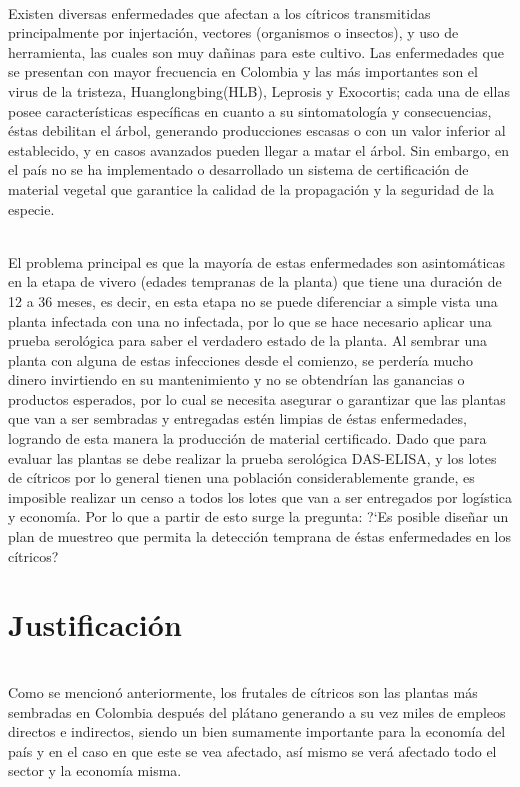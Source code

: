 ~\\Existen diversas enfermedades que afectan a los c\'{i}tricos transmitidas principalmente por injertaci\'{o}n, vectores (organismos o insectos), y uso de herramienta, las cuales son muy da\~{n}inas para este cultivo. Las enfermedades que se presentan con mayor frecuencia en Colombia y las m\'{a}s importantes son el virus de la tristeza, Huanglongbing(HLB), Leprosis y Exocortis; cada una de ellas posee caracter\'{i}sticas espec\'{i}ficas en cuanto a su sintomatolog\'{i}a y consecuencias, \'{e}stas debilitan el \'{a}rbol, generando producciones escasas o con un valor inferior al establecido, y en casos avanzados pueden llegar a matar el \'{a}rbol. Sin embargo, en el pa\'{i}s no se ha implementado o desarrollado un sistema de certificaci\'{o}n de material vegetal que garantice la calidad de la propagaci\'{o}n y la seguridad de la especie.

~\\El problema principal es que la mayor\'{i}a de estas enfermedades son asintom\'{a}ticas en la etapa de vivero (edades tempranas de la planta) que tiene una duraci\'{o}n de 12 a 36 meses, es decir, en esta etapa no se puede diferenciar a simple vista una planta infectada con una no infectada, por lo que se hace necesario aplicar una prueba serol\'{o}gica para saber el verdadero estado de la planta. Al sembrar una planta con alguna de estas infecciones desde el comienzo, se perder\'{i}a mucho dinero invirtiendo en su mantenimiento y no se obtendr\'{i}an las ganancias o productos esperados, por lo cual se necesita asegurar o garantizar que las plantas que van a ser sembradas y entregadas est\'{e}n limpias de \'{e}stas enfermedades, logrando de esta manera la producci\'{o}n de material certificado. Dado que para evaluar las plantas se debe realizar la prueba serol\'{o}gica DAS-ELISA, y los lotes de c\'{i}tricos por lo general tienen una poblaci\'{o}n considerablemente grande, es imposible realizar un censo a todos los lotes que van a ser entregados por log\'{i}stica y econom\'{i}a. Por lo que a partir de esto surge la pregunta: ?`Es posible dise\~{n}ar un plan de muestreo que permita la detecci\'{o}n temprana de \'{e}stas enfermedades en los c\'{i}tricos?


\section{Justificaci\'{o}n}
~\\Como se mencion\'{o} anteriormente, los frutales de c\'{i}tricos son las plantas m\'{a}s sembradas en Colombia despu\'{e}s del pl\'{a}tano generando a su vez miles de empleos directos e indirectos, siendo un bien sumamente importante para la econom\'{i}a del pa\'{i}s y en el caso en que este se vea afectado, as\'{i} mismo se ver\'{a} afectado todo el sector y la econom\'{i}a misma. 


